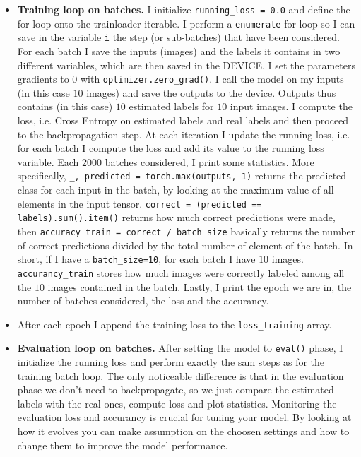 \documentclass[a4paper]{article}
\begin{document}
\begin{enumerate}
\begin{itemize}
     \item \textbf{Training loop on batches.} I initialize \texttt{running\_loss = 0.0} and define the for loop onto the trainloader iterable. I perform a \texttt{enumerate} for loop so I can save in the variable \texttt{i} the step (or sub-batches) that have been considered. For each batch I save the inputs (images) and the labels it contains in two different variables, which are then saved in  the DEVICE. I set the parameters gradients to 0 with \texttt{optimizer.zero\_grad()}. I call the model on my inputs (in this case $10$ images) and save the outputs to the device. Outputs thus contains (in this case) $10$ estimated labels for $10$ input images. I compute the loss, i.e. Cross Entropy on estimated labels and real labels and then proceed to the backpropagation step. At each iteration I update the running loss, i.e. for each batch I compute the loss and add its value to the running loss variable. Each $2000$ batches considered, I print some statistics. More specifically, \texttt{\_, predicted = torch.max(outputs, 1)} returns the predicted class for each input in the batch, by looking at the maximum value of all elements in the input tensor. \texttt{correct = (predicted == labels).sum().item()} returns how much correct predictions were made, then \texttt{accuracy\_train = correct / batch\_size} basically returns the number of correct predictions divided by the total number of element of the batch. In short, if I have a \texttt{batch\_size=10}, for each batch I have $10$ images. \texttt{accurancy\_train} stores how much images were correctly labeled among all the $10$ images contained in the batch. Lastly, I print the epoch we are in, the number of batches considered, the loss and the accurancy.
     \item After each epoch I append the training loss to the \texttt{loss\_training} array.
     \item \textbf{Evaluation loop on batches.} After setting the model to \texttt{eval()} phase, I initialize the running loss and perform exactly the sam steps as for the training batch loop. The only noticeable difference is that in the evaluation phase we don't need to backpropagate, so we just compare the estimated labels with the real ones, compute loss and plot statistics. Monitoring the evaluation loss and accurancy is crucial for tuning your model. By looking at how it evolves you can make assumption on the choosen settings and how to change them to improve the model performance. 
 \end{itemize}
 

\end{enumerate}
\end{document}
